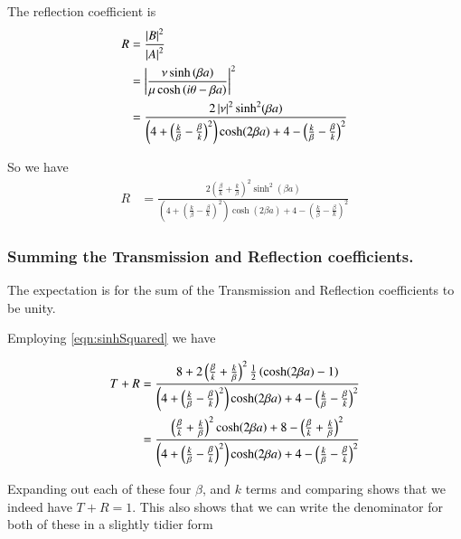 \documentclass{article}
\begin{document}
The reflection coefficient is
\begin{align*}
R &= \frac{\left\lvert{B}\right\rvert^2}{\left\lvert{A}\right\rvert^2} \\
&= 
\left\lvert{\frac{\nu \sinh\left( \beta a \right) }
{\mu \cosh\left( i\theta -\beta a \right) }}\right\rvert^2 \\
&= \frac{2 \left\lvert{\nu}\right\rvert^2 \sinh^2( \beta a)} { 
\left(4 + \left( \frac{k}{\beta} -\frac{\beta}{k} \right)^2 \right)
\cosh(2\beta a)
+ 
4 - \left(\frac{k}{\beta} - \frac{\beta}{k} \right)^2 
}
\end{align*}

So we have
\begin{align}\label{eqn:Rcoeff1}
R 
&= \frac{2 
\left(\frac{\beta}{k} + \frac{k}{\beta} \right)^2 
\sinh^2( \beta a)} { 
\left(4 + \left( \frac{k}{\beta} -\frac{\beta}{k} \right)^2 \right)
\cosh(2\beta a)
+ 
4 - \left(\frac{k}{\beta} - \frac{\beta}{k} \right)^2 
}
\end{align}

\subsubsection{ Summing the Transmission and Reflection coefficients. }

The expectation is for the 
sum of the Transmission and Reflection coefficients to be unity.

Employing \ref{eqn:sinhSquared} we have

\begin{align*}
T + R 
&= \frac{8 + 2 
\left(\frac{\beta}{k} + \frac{k}{\beta} \right)^2 
\frac{1}{2} \left( \cosh(2 \beta a) -1 \right) 
} { 
\left(4 + \left( \frac{k}{\beta} -\frac{\beta}{k} \right)^2 \right)
\cosh(2\beta a)
+ 
4 - \left(\frac{k}{\beta} - \frac{\beta}{k} \right)^2 
} \\
&= \frac{ 
\left(\frac{\beta}{k} + \frac{k}{\beta} \right)^2 
\cosh(2 \beta a) + 8 - \left(\frac{\beta}{k} + \frac{k}{\beta} \right)^2 
} { 
\left(4 + \left( \frac{k}{\beta} -\frac{\beta}{k} \right)^2 \right)
\cosh(2\beta a)
+ 
4 - \left(\frac{k}{\beta} - \frac{\beta}{k} \right)^2 
} \\
\end{align*}

Expanding out each of these four $\beta$, and $k$ terms and comparing shows that
we indeed have $T + R = 1$.  This also shows that we can write the denominator for both of
these 
in a 
slightly tidier form
\end{document}
